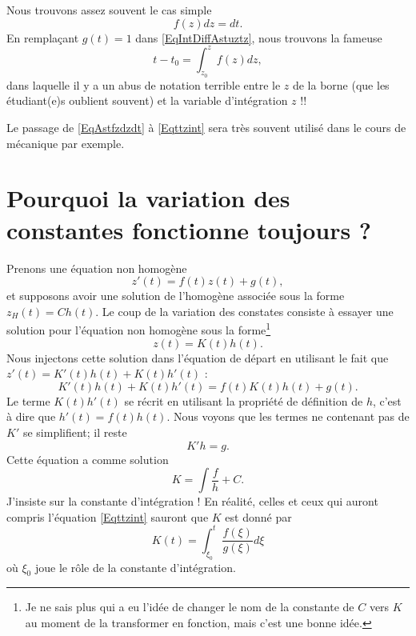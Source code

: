 Nous trouvons assez souvent le cas simple
\begin{equation}    \label{EqAstfzdzdt}
    f(z)dz=dt.
\end{equation}
En remplaçant $g(t)=1$ dans \eqref{EqIntDiffAstuztz}, nous trouvons la fameuse
\begin{equation}        \label{Eqttzint}
    t-t_0=\int_{z_0}^zf(z)dz,
\end{equation}
dans laquelle il y a un abus de notation terrible entre le $z$ de la borne (que les étudiant(e)s oublient souvent) et la variable d'intégration $z$ !!

Le passage de \eqref{EqAstfzdzdt} à \eqref{Eqttzint} sera très souvent utilisé dans le cours de mécanique par exemple.


                    \section{Pourquoi la variation des constantes fonctionne toujours ?}

Prenons une équation non homogène 
\begin{equation}        \label{EqAstNNHomo}
    z'(t)=f(t)z(t)+g(t),
\end{equation}
et supposons avoir une solution de l'homogène associée sous la forme $z_H(t)=Ch(t)$. Le coup de la variation des constates consiste à essayer une solution pour l'équation non homogène sous la forme\footnote{Je ne sais plus qui a eu l'idée de changer le nom de la constante de $C$ vers $K$ au moment de la transformer en fonction, mais c'est une bonne idée.}
\begin{equation}
    z(t)=K(t)h(t).
\end{equation}
Nous injectons cette solution dans l'équation de départ en utilisant le fait que $z'(t)=K'(t)h(t)+K(t)h'(t)$ :
\begin{equation}
    K'(t)h(t)+K(t)h'(t)=f(t)K(t)h(t)+g(t).
\end{equation}
Le terme $K(t)h'(t)$ se récrit en utilisant la propriété de définition de $h$, c'est à dire que $h'(t)=f(t)h(t)$. Nous voyons que les termes ne contenant pas de $K'$ se simplifient; il reste
\begin{equation}
    K'h=g.
\end{equation}
Cette équation a comme solution
\begin{equation}
    K=\int \frac{ f }{ h }+C.
\end{equation}
J'insiste sur la constante d'intégration ! En réalité, celles et ceux qui auront compris l'équation \eqref{Eqttzint} sauront que $K$ est donné par
\begin{equation}
    K(t)=\int_{\xi_0}^{t}\frac{ f(\xi) }{ g(\xi) }d\xi
\end{equation}
où $\xi_0$ joue le rôle de la constante d'intégration.

